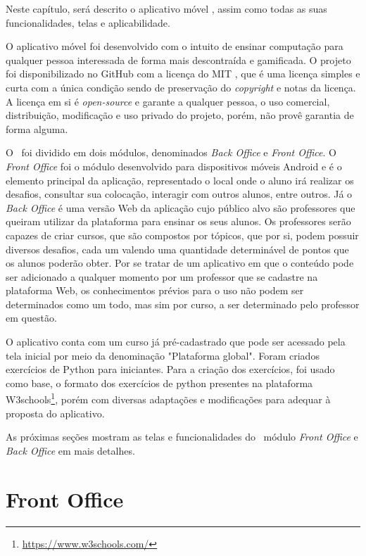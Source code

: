 
Neste capítulo, será descrito o aplicativo móvel \appName, assim como todas as suas funcionalidades, telas e aplicabilidade.

O aplicativo móvel foi desenvolvido com o intuito de ensinar computação para qualquer pessoa interessada de forma mais descontraída e gamificada. O projeto foi disponibilizado no GitHub com a licença do MIT \cite{mit-license}, que é uma licença simples e curta com a única condição sendo de preservação do \textit{copyright} e notas da licença. A licença em si é \textit{open-source} e garante a qualquer pessoa, o uso comercial, distribuição, modificação e uso privado do projeto, porém, não provê garantia de forma alguma.

O \appName\ foi dividido em dois módulos, denominados \textit{Back Office} e \textit{Front Office}. O \textit{Front Office} foi o módulo desenvolvido para dispositivos móveis Android e é o elemento principal da aplicação, representado o local onde o aluno irá realizar os desafios, consultar sua colocação, interagir com outros alunos, entre outros. Já o \textit{Back Office} é uma versão Web da aplicação cujo público alvo são professores que queiram utilizar da plataforma para ensinar os seus alunos. Os professores serão capazes de criar cursos, que são compostos por tópicos, que por si, podem possuir diversos desafios, cada um valendo uma quantidade determinável de pontos que os alunos poderão obter. Por se tratar de um aplicativo em que o conteúdo pode ser adicionado a qualquer momento por um professor que se cadastre na plataforma Web, os conhecimentos prévios para o uso não podem ser determinados como um todo, mas sim por curso, a ser determinado pelo professor em questão.

O aplicativo conta com um curso já pré-cadastrado que pode ser acessado pela tela inicial por meio da denominação "Plataforma global". Foram criados exercícios de Python para iniciantes. Para a criação dos exercícios, foi usado como base, o formato dos exercícios de python presentes na plataforma W3schools\footnote{\url{https://www.w3schools.com/}}, porém com diversas adaptações e modificações para adequar à proposta do aplicativo.

As próximas seções mostram as telas e funcionalidades do \appName\, módulo \textit{Front Office} e \textit{Back Office} em mais detalhes.

\section{Front Office}

